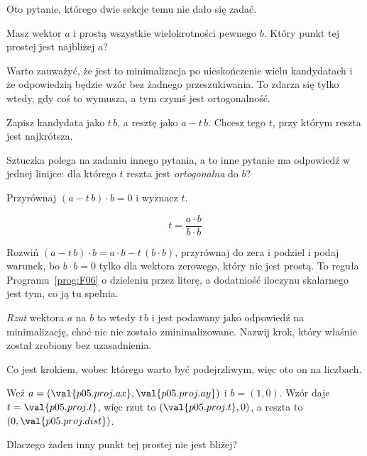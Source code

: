 \begin{fr}
Oto pytanie, którego dwie sekcje temu nie dało się zadać.

Masz wektor $a$ i prostą \dash{} wszystkie wielokrotności pewnego $b$. Który
punkt tej prostej jest najbliżej $a$?

Warto zauważyć, że jest to minimalizacja po nieskończenie wielu kandydatach i
że odpowiedzią będzie wzór bez żadnego przeszukiwania. To zdarza się tylko
wtedy, gdy coś to wymusza, a tym czymś jest ortogonalność.
\end{fr}

\begin{fr}
Zapisz kandydata jako $t\,b$, a resztę jako $a - t\,b$. Chcesz tego $t$, przy
którym reszta jest najkrótsza.

Sztuczka polega na zadaniu innego pytania, a to inne pytanie ma odpowiedź w
jednej linijce: dla którego $t$ reszta jest \emph{ortogonalna} do $b$?

Przyrównaj $(a - t\,b) \cdot b = 0$ i wyznacz $t$.
\dotline
\nextframe
\end{fr}

\begin{fr}
\begin{ansblock}
\[ t = \frac{a \cdot b}{b \cdot b} \]
\end{ansblock}

Rozwiń $(a - t\,b) \cdot b = a \cdot b - t\,(b \cdot b)$, przyrównaj do zera i
podziel \dash{} i podaj warunek, bo $b \cdot b = 0$ tylko dla wektora zerowego,
który nie jest prostą. To reguła Programu~\ref{prog:F06} o dzieleniu przez
literę, a dodatniość iloczynu skalarnego jest tym, co ją tu spełnia.

\emph{Rzut} wektora $a$ na $b$ to wtedy $t\,b$ \dash{} i jest podawany jako
odpowiedź na minimalizację, choć nic nie zostało zminimalizowane. Nazwij krok,
który właśnie został zrobiony bez uzasadnienia.
\dotline
\nextframe
\end{fr}

\begin{fr}
Co jest krokiem, wobec którego warto być podejrzliwym, więc oto on na liczbach.

Weź $a = (\val{p05.proj.ax}, \val{p05.proj.ay})$ i $b = (1, 0)$. Wzór daje
$t = \val{p05.proj.t}$, więc rzut to $(\val{p05.proj.t}, 0)$, a reszta to
$(0, \val{p05.proj.dist})$.

Dlaczego żaden inny punkt tej prostej nie jest bliżej?
\nextframe
\end{fr}

